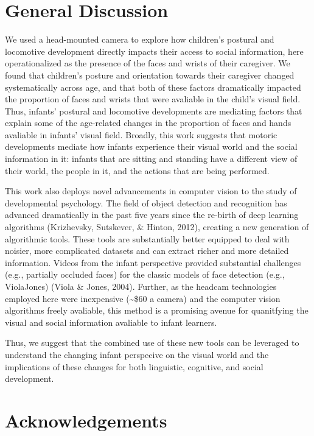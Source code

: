 \documentclass[10pt, letterpaper]{article}
\begin{document}
\section{General Discussion}\label{general-discussion}

We used a head-mounted camera to explore how children's postural and
locomotive development directly impacts their access to social
information, here operationalized as the presence of the faces and
wrists of their caregiver. We found that children's posture and
orientation towards their caregiver changed systematically across age,
and that both of these factors dramatically impacted the proportion of
faces and wrists that were avaliable in the child's visual field. Thus,
infants' postural and locomotive developments are mediating factors that
explain some of the age-related changes in the proportion of faces and
hands avaliable in infants' visual field. Broadly, this work suggests
that motoric developments mediate how infants experience their visual
world and the social information in it: infants that are sitting and
standing have a different view of their world, the people in it, and the
actions that are being performed.

This work also deploys novel advancements in computer vision to the
study of developmental psychology. The field of object detection and
recognition has advanced dramatically in the past five years since the
re-birth of deep learning algorithms (Krizhevsky, Sutskever, \& Hinton,
2012), creating a new generation of algorithmic tools. These tools are
substantially better equipped to deal with noisier, more complicated
datasets and can extract richer and more detailed information. Videos
from the infant perspective provided substantial challenges (e.g.,
partially occluded faces) for the classic models of face detection
(e.g., ViolaJones) (Viola \& Jones, 2004). Further, as the headcam
technologies employed here were inexpensive (\textasciitilde{}\$60 a
camera) and the computer vision algorithms freely avaliable, this method
is a promising avenue for quanitfying the visual and social information
avaliable to infant learners.

Thus, we suggest that the combined use of these new tools can be
leveraged to understand the changing infant perspecive on the visual
world and the implications of these changes for both linguistic,
cognitive, and social development.

\section{Acknowledgements}\label{acknowledgements}
\end{document}
